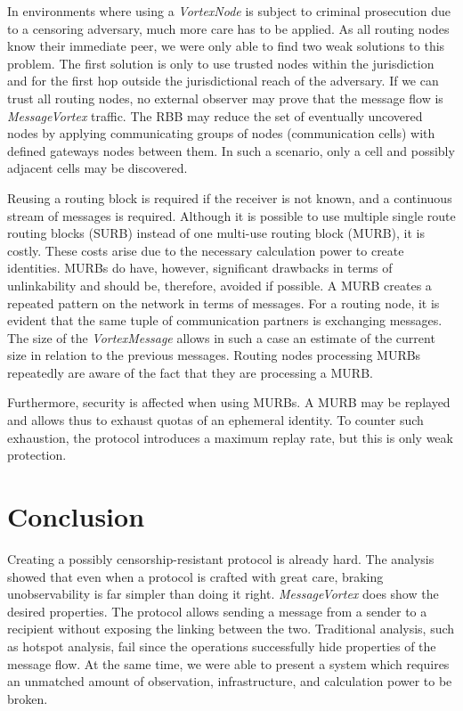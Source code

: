 \documentclass[acmsmall, screen, final]{acmart}
\begin{document}
	In environments where using a \emph{VortexNode} is subject to criminal prosecution due to a censoring adversary, much more care has to be applied. As all routing nodes know their immediate peer, we were only able to find two weak solutions to this problem. The first solution is only to use trusted nodes within the jurisdiction and for the first hop outside the jurisdictional reach of the adversary. If we can trust all routing nodes, no external observer may prove that the message flow is \emph{MessageVortex} traffic. The RBB may reduce the set of eventually uncovered nodes by applying communicating groups of nodes (communication cells) with defined gateways nodes between them. In such a scenario, only a cell and possibly adjacent cells may be discovered.
	
	Reusing a routing block is required if the receiver is not known, and a continuous stream of messages is required. Although it is possible to use multiple single route routing blocks (SURB) instead of one multi-use routing block (MURB), it is costly. These costs arise due to the necessary calculation power to create identities. MURBs do have, however, significant drawbacks in terms of unlinkability and should be, therefore, avoided if possible. A MURB creates a repeated pattern on the network in terms of messages. For a routing node, it is evident that the same tuple of communication partners is exchanging messages. The size of the \emph{VortexMessage} allows in such a case an estimate of the current size in relation to the previous messages. Routing nodes processing MURBs repeatedly are aware of the fact that they are processing a MURB.
	
	Furthermore, security is affected when using MURBs. A MURB may be replayed and allows thus to exhaust quotas of an ephemeral identity. To counter such exhaustion, the protocol introduces a maximum replay rate, but this is only weak protection.
	
	\section{Conclusion}
	Creating a possibly censorship-resistant protocol is already hard. The analysis showed that even when a protocol is crafted with great care, braking unobservability is far simpler than doing it right. \emph{MessageVortex} does show the desired properties. The protocol allows sending a message from a sender to a recipient without exposing the linking between the two. Traditional analysis, such as hotspot analysis, fail since the operations successfully hide properties of the message flow. At the same time, we were able to present a system which requires an unmatched amount of observation, infrastructure, and calculation power to be broken.
	
\end{document}
